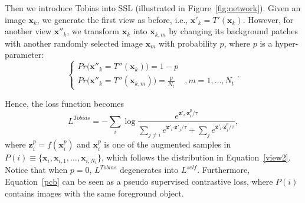 \documentclass[letterpaper]{article}
\begin{document}
Then we introduce Tobias into SSL (illustrated in Figure~\ref{fig:network}). Given an image $\boldsymbol{x}_k$, we generate the first view as before, i.e., $\boldsymbol{x}'_k=T'(\boldsymbol{x}_k)$. However, for another view $\boldsymbol{x}''_k$, we transform $\boldsymbol{x}_k$ into $\boldsymbol{x}_{k,m}$ by changing its background patches with another randomly selected image $\boldsymbol{x}_m$ with probability $p$, where $p$ is a hyper-parameter:
\begin{equation}
	\label{view2}
	\left\{
	\begin{array}{lcl}
		Pr\big(\boldsymbol{x}''_k=T''(\boldsymbol{x}_k)\big)=1-p&\\
		Pr\big(\boldsymbol{x}''_k=T''(\boldsymbol{x}_{k,m})\big)=\frac{p}{N_t}&, m=1,\dots,N_t
	\end{array} \right. .
\end{equation}

Hence, the loss function becomes
\begin{equation}
	\label{pcb}
	L^{Tobias}=-\sum_{i} \log \frac{e^{\boldsymbol{z}'_i\boldsymbol{\cdot}\boldsymbol{z}^p_i/\tau}}{\sum_{j\neq i} e^{\boldsymbol{z}'_i\boldsymbol{\cdot} \boldsymbol{z}'_j/\tau}+\sum_{j} e^{\boldsymbol{z}'_i\boldsymbol{\cdot} \boldsymbol{z}^p_j/\tau}},
\end{equation}
where $\boldsymbol{z}^p_i=f(\boldsymbol{x}^p_i)$ and $\boldsymbol{x}^p_i$ is one of the augmented samples in $P(i)\equiv\{\boldsymbol{x}_i, \boldsymbol{x}_{i,1}, \dots, \boldsymbol{x}_{i,N_t}\}$, which follows the distribution in Equation~\ref{view2}. Notice that when $p=0$, $L^{Tobias}$ degenerates into $L^{self}$. Furthermore, Equation~\ref{pcb} can be seen as a pseudo supervised contrastive loss, where $P(i)$ contains images with the same foreground object.
\end{document}
